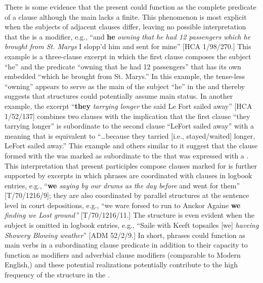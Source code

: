 There is some evidence that the present  could function as the complete predicate of a clause although the main  lacks a finite. This phenomenon is most explicit when the subjects of adjacent clauses differ, leaving no possible interpretation that the  is a modifier, e.g., “and \textbf{he} \textit{owning that he had 12 passengers which he brought from St. Marys} I slopp’d him and sent for mine” [HCA 1/98/270.] This example is a three-clause excerpt in which the first clause composes the subject “he” and the predicate “owning that he had 12 passengers” that has its own embedded  “which he brought from St. Marys.” In this example, the tense-less  “owning” appears to serve as the main  of the subject “he” in the  and thereby suggests that  structures could potentially assume main  status. In another example, the excerpt “\textbf{they} \textit{tarrying longer} the said Le Fort sailed away” [HCA 1/52/137] combines two clauses with the implication that the first clause “they tarrying longer” is subordinate to the second clause “LeFort sailed away” with a meaning that is equivalent to “…because they tarried [i.e., stayed/waited] longer, LeFort sailed away.” This example and others similar to it suggest that the clause formed with the  was marked as subordinate to the  that was expressed with a . This interpretation that present participles compose clauses marked for  is further supported by excerpts in which  phrases are coordinated with clauses in logbook entries, e.g., “\textbf{we} \textit{saying by our drums as the day before} and went for them” [T/70/1216/9]; they are also coordinated by parallel structures at the sentence level in court depositions, e.g., “we ware forsed to run to Anckor Againe \textbf{we} \textit{finding we Lost ground”} [T/70/1216/11.] The structure is even evident when the  subject is omitted in logbook entries, e.g., “Saile with Keeft topsailes [we] \textit{haveing Showery Blowing weather}” [ADM 52/2/9.] In short,  phrases could function as main verbs in a subordinating clause predicate in addition to their capacity to function as   modifiers and adverbial clause modifiers (comparable to Modern English,) and these potential realizations potentially contribute to the high frequency of the structure in the . 

